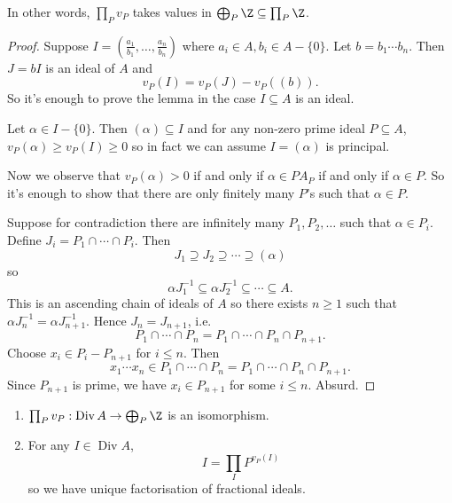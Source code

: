 \documentclass[a4paper]{article}
\DeclareMathOperator{\Div}{Div}
\begin{document}
In other words, \(\prod_P v_P\) takes values in \(\bigoplus_P \Z \subseteq \prod_P \Z\).

\begin{proof}
  Suppose \(I = (\frac{a_1}{b_1}, \dots, \frac{a_n}{b_n})\) where \(a_i \in A, b_i \in A - \{0\}\). Let \(b = b_1 \cdots b_n\). Then \(J = bI\) is an ideal of \(A\) and
  \[
    v_P(I) = v_P(J) - v_P((b)).
  \]
  So it's enough to prove the lemma in the case \(I \subseteq A\) is an ideal.

  Let \(\alpha \in I - \{0\}\). Then \((\alpha) \subseteq I\) and for any non-zero prime ideal \(P \subseteq A\), \(v_P(\alpha) \geq v_P(I) \geq 0\) so in fact we can assume \(I = (\alpha)\) is principal.

  Now we observe that \(v_P(\alpha) > 0\) if and only if \(\alpha \in P A_P\) if and only if \(\alpha \in P\). So it's enough to show that there are only finitely many \(P\)'s such that \(\alpha \in P\).

  Suppose for contradiction there are infinitely many \(P_1, P_2, \dots\) such that \(\alpha \in P_i\). Define \(J_i = P_1 \cap \cdots \cap P_i\). Then
  \[
    J_1 \supseteq J_2 \supseteq \cdots \supseteq (\alpha)
  \]
  so
  \[
    \alpha J_1^{-1} \subseteq \alpha J_2^{-1} \subseteq \cdots \subseteq A.
  \]
  This is an ascending chain of ideals of \(A\) so there exists \(n \geq 1\) such that \(\alpha J_n^{-1} = \alpha J_{n + 1}^{-1}\). Hence \(J_n = J_{n + 1}\), i.e.
  \[
    P_1 \cap \cdots \cap P_n = P_1 \cap \cdots \cap P_n \cap P_{n + 1}.
  \]
  Choose \(x_i \in P_i - P_{n + 1}\) for \(i \leq n\). Then
  \[
    x_1 \cdots x_n \in P_1 \cap \cdots \cap P_n = P_1 \cap \cdots \cap P_n \cap P_{n + 1}.
  \]
  Since \(P_{n + 1}\) is prime, we have \(x_i \in P_{n + 1}\) for some \(i \leq n\). Absurd.
\end{proof}

\begin{proposition}\leavevmode
  \begin{enumerate}
  \item \(\prod_P v_P: \Div A \to \bigoplus_P \Z\) is an isomorphism.
  \item For any \(I \in \Div A\),
    \[
      I = \prod_I P^{v_P(I)}
    \]
    so we have unique factorisation of fractional ideals.
  \end{enumerate}
\end{proposition}
\end{document}
